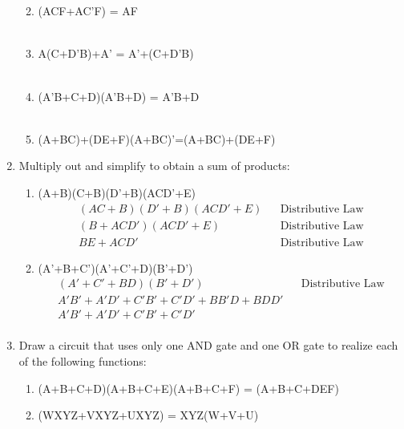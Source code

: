 \documentclass[12pt]{article}
\begin{document}
\begin{enumerate}
\begin{enumerate}
            \\\\
            \item (ACF+AC'F) = AF
            \\\\
            \item A(C+D'B)+A' = A'+(C+D'B)
            \\\\
            \item (A'B+C+D)(A'B+D) = A'B+D
            \\\\
            
            \item (A+BC)+(DE+F)(A+BC)'=(A+BC)+(DE+F)
            \\
        \end{enumerate}
    \addtocounter{enumi}{1}\item Multiply out and simplify to obtain a sum of products:
        \begin{enumerate}
            \item (A+B)(C+B)(D'+B)(ACD'+E)
            \begin{align*}
                (AC+B)(D'+B)(ACD'+E) && \text{Distributive Law}\\
                (B+ACD')(ACD'+E)&& \text{Distributive Law}\\
                BE+ACD' && \text{Distributive Law}
            \end{align*}
            \item  (A'+B+C')(A'+C'+D)(B'+D')
            \begin{align*}
                (A'+C'+BD)(B'+D') && \text{Distributive Law}\\
                A'B'+A'D'+C'B'+C'D'+BB'D+BDD'\\
                A'B'+A'D'+C'B'+C'D'\\
            \end{align*}
        \end{enumerate}
    \newpage\addtocounter{enumi}{1}\item Draw a circuit that uses only one AND gate and one OR gate to realize each of the following functions:
        \begin{enumerate}
            \item (A+B+C+D)(A+B+C+E)(A+B+C+F) = (A+B+C+DEF)
            \item (WXYZ+VXYZ+UXYZ) = XYZ(W+V+U)

\end{enumerate}
\end{enumerate}
\end{document}
